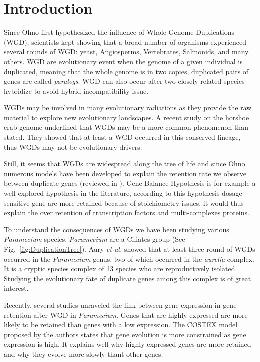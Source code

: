 \section*{Introduction}

Since Ohno first hypothesized the influence of Whole-Genome Duplications (WGD), scientists kept showing that a broad number of organisms experienced several rounds of WGD: yeast, Angiosperms, Vertebrates, Salmonids, and many others. WGD are evolutionary event when the genome of a given individual is duplicated, meaning that the whole genome is in two copies, duplicated pairs of genes are called \textit{paralogs}. WGD can also occur after two closely related species hybridize to avoid hybrid incompatibility issue.

WGDs may be involved in many evolutionary radiations as they provide the raw material to explore new evolutionary landscapes. A recent study on the horshoe crab genome underlined that WGDs may be a more common phenomenon than stated. They showed that at least a WGD occurred in this conserved lineage, thus WGDs may not be evolutionary drivers.

Still, it seems that WGDs are widespread along the tree of life and since Ohno numerous models have been developed to explain the retention rate we observe between duplicate genes (reviewed in ). Gene Balance Hypothesis is for example a well explored hypothesis in the literature, according to this hypothesis dosage-sensitive gene are more retained because of stoichiometry issues, it would thus explain the over retention of transcription factors and multi-complexes proteins.

To understand the consequences of WGDs we have been studying various \textit{Paramecium} species. \textit{Paramecium} are a Ciliates group (See Fig.~\ref{fig:DuplicationTree}). Aury \textit{et al.} showed that at least three round of WGDs occurred in the \textit{Paramecium} genus, two of which occurred in the \textit{aurelia} complex. It is a cryptic species complex of 13 species who are reproductively isolated. Studying the evolutionary fate of duplicate genes among this complex is of great interest.

Recently, several studies unraveled the link between gene expression in gene retention after WGD in \textit{Paramecium}. Genes that are highly expressed are more likely to be retained than genes with a low expression. The COSTEX model proposed by the authors states that gene evolution is more constrained as gene expression is high. It explains well why highly expressed genes are more retained and why they evolve more slowly thant other genes.

